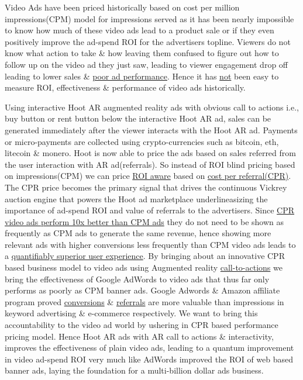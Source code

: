 Video Ads have been priced historically based on cost per million impressions(CPM) model for impressions served as it has been nearly impossible to know how much of these video ads lead to a product sale or if they even positively improve the ad-spend ROI for the advertisers topline. Viewers do not know what action to take \& how leaving them confused to figure out how to follow up on the video ad they just saw, leading to viewer engagement drop off leading to lower sales \& \underline{poor ad performance}. Hence it has \underline{not} been easy to measure ROI, effectiveness \& performance of video ads historically.

Using interactive Hoot AR augmented reality ads with obvious call to actions i.e., buy button or rent button below the interactive Hoot AR ad, sales can be generated immediately after the viewer interacts with the Hoot AR ad. Payments or micro-payments are collected using crypto-currencies such as bitcoin, eth, litecoin \& monero. Hoot is now able to price the ads based on sales referred from the user interaction with AR ad(referrals). So instead of ROI blind pricing based on impressions(CPM) we can price \underline{ROI aware} based on \underline{cost per referral(CPR)}. The CPR price becomes the primary signal that drives the continuous Vickrey auction engine that powers the Hoot ad marketplace underlineasizing the importance of ad-spend ROI and value of referrals to the advertisers. Since \underline{CPR video ads perform 10x better than CPM ads} they do not need to be shown as frequently as CPM ads to generate the same revenue, hence showing more relevant ads with higher conversions less frequently than CPM video ads leads to a \underline{quantifiably superior user experience}. By bringing about an innovative CPR based business model to video ads using Augmented reality \underline{call-to-actions} we bring the effectiveness of Google AdWords to video ads that thus far only performs as poorly as CPM banner ads. Google Adwords \& Amazon affiliate program proved \underline{conversions} \& \underline{referrals} are more valuable than impressions in keyword advertising \& e-commerce respectively. We want to bring this accountability to the video ad world by ushering in CPR based performance pricing model. Hence Hoot AR ads with AR call to actions \& interactivity, improves the effectiveness of plain video ads, leading to a quantum improvement in video ad-spend ROI very much like AdWords improved the ROI of web based banner ads, laying the foundation for a multi-billion dollar ads business. 
